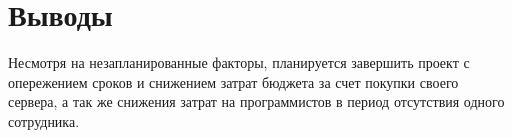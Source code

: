 \chapter{Выводы}

Несмотря на незапланированные факторы, планируется завершить проект с опережением сроков и снижением затрат бюджета за счет покупки своего сервера, а так же снижения затрат на программистов в период отсутствия одного сотрудника.

